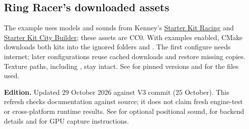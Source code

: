 \documentclass[11pt,a4paper]{article}
\begin{document}
\subsection*{Ring Racer's downloaded assets}
The  example uses models and sounds from Kenney's \href{https://github.com/KenneyNL/Starter-Kit-Racing}{Starter Kit Racing} and \href{https://github.com/KenneyNL/Starter-Kit-City-Builder}{Starter Kit City Builder}; these assets are CC0. With examples enabled, CMake downloads both kits into the ignored folders  and . The first configure needs internet; later configurations reuse cached downloads and restore missing copies. Texture paths, including , stay intact. See  for pinned versions and  for the files used.

\textbf{Edition.} Updated 29 October 2026 against V3 commit  (25 October). This refresh checks documentation against source; it does not claim fresh engine-test or cross-platform runtime results. See  for optional positional sound,  for backend details and  for GPU capture instructions.
\end{document}
